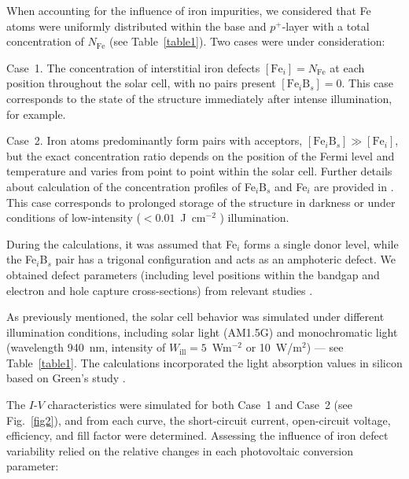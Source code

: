 \documentclass[a4paper,fleqn]{cas-sc}
\begin{document}
When accounting for the influence of iron impurities,
we considered that Fe atoms were uniformly distributed within the base and $p^+$-layer
with a total concentration of $N_\mathrm{Fe}$ (see Table~\ref{table1}).
Two cases were under consideration:

Case~1.
The concentration of interstitial iron defects $\left[\mathrm{Fe}_i\right]=N_\mathrm{Fe}$  at each position throughout the solar cell,
with no pairs present $\left[\mathrm{Fe}_i\mathrm{B}_s\right]=0$.
This case corresponds to the state of the structure immediately after intense illumination, for example.

Case~2.
Iron atoms predominantly form pairs with acceptors, $\left[\mathrm{Fe}_i\mathrm{B}_s\right] \gg \left[\mathrm{Fe}_i\right]$,
but the exact concentration ratio depends on the position of the Fermi level and temperature \cite{FeB:kinetic,MurphyJAP2011}
and varies from point to point within the solar cell.
Further details about calculation of the concentration profiles of Fe$_i$B$_s$ and Fe$_i$ are provided in \cite{Olikh2022PPV,Olikh2019SM}.
This case corresponds to prolonged storage of the structure in darkness or under conditions of low-intensity ($< 0.01$~J~cm$^{-2}$ \cite{Macdonald2004}) illumination.


During the calculations, it was assumed that Fe$_i$ forms a single donor level,
while the Fe$_i$B$_s$ pair has a trigonal configuration and acts as an amphoteric defect.
We obtained defect parameters (including level positions within the bandgap and electron and hole capture cross-sections) from relevant studies \cite{ROUGIEUX2018,Istratov1999}.

As previously mentioned, the solar cell behavior was simulated under different illumination conditions,
including solar light (AM1.5G) and monochromatic light (wavelength 940~nm, intensity of $W_\mathrm{ill} = 5$~Wm$^{-2}$ or 10~W/$\mathrm{m}^{2}$) --– see Table~\ref{table1}.
The calculations incorporated the light absorption values in silicon based on Green's study \cite{Green2022}.


The $I$-$V$ characteristics were simulated for both Case~1 and Case~2 (see Fig.~\ref{fig2}),
and from each curve, the short-circuit current, open-circuit voltage, efficiency, and fill factor were determined.
Assessing the influence of iron defect variability relied on the relative changes in each photovoltaic conversion parameter:
\end{document}
